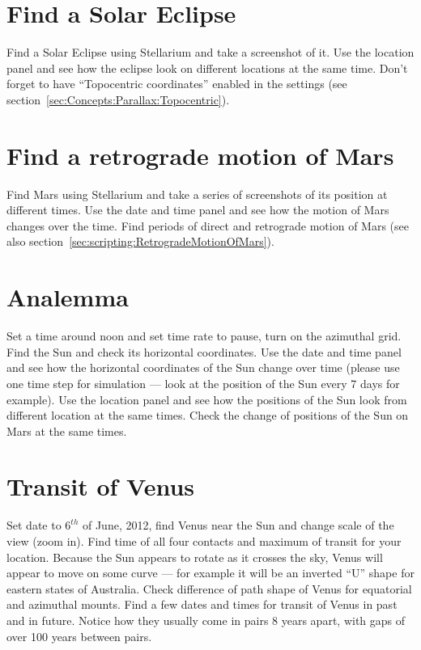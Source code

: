 \section{Find a Solar Eclipse}
\label{sec:Exercises:SolarEclipse}

Find a Solar Eclipse using Stellarium and take a screenshot of it. Use
the location panel and see how the eclipse look on different locations
at the same time. Don't forget to have ``Topocentric coordinates'' enabled 
in the settings (see section~\ref{sec:Concepts:Parallax:Topocentric}).

\section{Find a retrograde motion of Mars}
\label{sec:Exercises:RetrogradeMotionOfMars}

Find Mars using Stellarium and take a series of screenshots of its 
position at different times. Use the date and time panel and see how 
the motion of Mars changes over the time. Find periods of direct 
and retrograde motion of Mars (see also section~\ref{sec:scripting:RetrogradeMotionOfMars}).

\section{Analemma}
\label{sec:Exercises:Analemma}

Set a time around noon and set time rate to pause, turn on the 
azimuthal grid. Find the Sun and check its horizontal coordinates. 
Use the date and time panel and see how the horizontal coordinates 
of the Sun change over time (please use one time step for 
simulation --- look at the position of the Sun every 7 days for 
example). Use the location panel and see how the positions of the 
Sun look from different location at the same times. Check the change 
of positions of the Sun on Mars at the same times.

\section{Transit of Venus}
\label{sec:Exercises:TransitOfVenus}

Set date to $6^{th}$ of June, 2012, find Venus near the Sun and change 
scale of the view (zoom in). Find time of all four contacts and maximum of 
transit for your location. Because the Sun appears to rotate as 
it crosses the sky, Venus will appear to move on some curve --- 
for example it will be an inverted ``U'' shape for eastern states 
of Australia. Check difference of path shape of Venus for 
equatorial and azimuthal mounts. Find a few dates and times for 
transit of Venus in past and in future. Notice how they usually 
come in pairs 8 years apart, with gaps of over 100 years between pairs.

